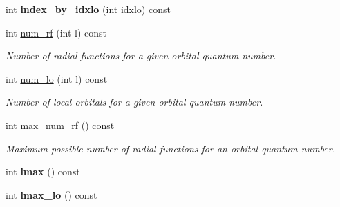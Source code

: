 \begin{DoxyCompactItemize}
\item 
\hypertarget{classsirius_1_1radial__functions__index_a703260a793ce003b8c2fff691291499c}{}int {\bfseries index\+\_\+by\+\_\+idxlo} (int idxlo) const \label{classsirius_1_1radial__functions__index_a703260a793ce003b8c2fff691291499c}

\item 
int \hyperlink{classsirius_1_1radial__functions__index_a00d7dc8d9c9600306208ec340d1bdec1}{num\+\_\+rf} (int l) const 
\begin{DoxyCompactList}\small\item\em Number of radial functions for a given orbital quantum number. \end{DoxyCompactList}\item 
int \hyperlink{classsirius_1_1radial__functions__index_a3ff0d225c96dcc1f13ad66b7728613c0}{num\+\_\+lo} (int l) const 
\begin{DoxyCompactList}\small\item\em Number of local orbitals for a given orbital quantum number. \end{DoxyCompactList}\item 
int \hyperlink{classsirius_1_1radial__functions__index_a46a945ef3030e1201f8f0526bfc5e11b}{max\+\_\+num\+\_\+rf} () const 
\begin{DoxyCompactList}\small\item\em Maximum possible number of radial functions for an orbital quantum number. \end{DoxyCompactList}\item 
\hypertarget{classsirius_1_1radial__functions__index_a8b885a583f639e45860ab4e7e495106e}{}int {\bfseries lmax} () const \label{classsirius_1_1radial__functions__index_a8b885a583f639e45860ab4e7e495106e}

\item 
\hypertarget{classsirius_1_1radial__functions__index_a09b26752085ac2fbc7669835e7dcaee2}{}int {\bfseries lmax\+\_\+lo} () const \label{classsirius_1_1radial__functions__index_a09b26752085ac2fbc7669835e7dcaee2}

\end{DoxyCompactItemize}
